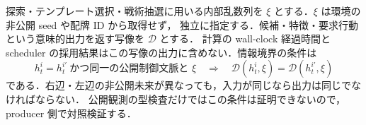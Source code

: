 探索・テンプレート選択・戦術抽選に用いる内部乱数列を $\xi$ とする．$\xi$ は環境の非公開 seed や配牌 ID から取得せず，
独立に指定する．候補・特徴・要求行動という意味的出力を返す写像を $\mathcal D$ とする．
計算の wall-clock 経過時間と scheduler の採用結果はこの写像の出力に含めない．情報境界の条件は
\begin{equation}\label{eq:privacy}
 h_t^i=h_t^{i\prime}\ \text{かつ同一の公開制御文脈と }\xi
 \quad\Longrightarrow\quad
 \mathcal D(h_t^i,\xi)=\mathcal D(h_t^{i\prime},\xi)
\end{equation}
である．右辺・左辺の非公開未来が異なっても，入力が同じなら出力は同じでなければならない．
公開観測の型検査だけではこの条件は証明できないので，producer 側で対照検証する．

